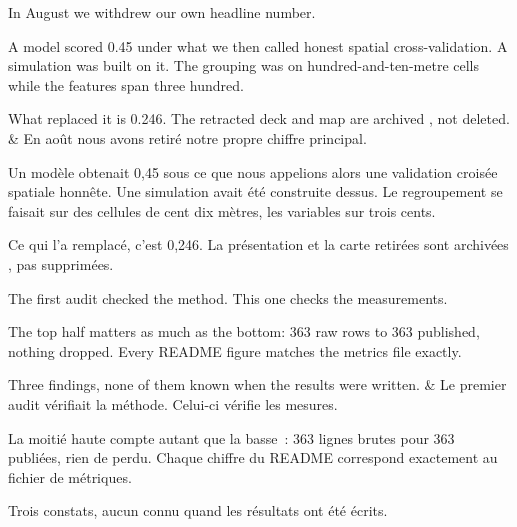 \documentclass[10pt,a4paper]{article}
\begin{document}
\begin{say}
In August we withdrew our own headline number.

A model scored 0.45 under what we then called honest spatial cross-validation. A
simulation was built on it. The grouping was on hundred-and-ten-metre cells while
the features span three hundred. 

What replaced it is 0.246. The retracted deck and map are archived , not deleted.
&
En août nous avons retiré notre propre chiffre principal.

Un modèle obtenait 0,45 sous ce que nous appelions alors une validation croisée
spatiale honnête. Une simulation avait été construite dessus. Le regroupement se
faisait sur des cellules de cent dix mètres, les variables sur trois cents.

Ce qui l'a remplacé, c'est 0,246. La présentation et la carte retirées sont
archivées , pas supprimées.
\end{say}

\begin{say}
The first audit checked the method. This one checks the measurements.

The top half matters as much as the bottom: 363 raw rows to 363 published, nothing
dropped. Every README figure matches the metrics file exactly.

 Three
findings, none of them known when the results were written.
&
Le premier audit vérifiait la méthode. Celui-ci vérifie les mesures.

La moitié haute compte autant que la basse~: 363 lignes brutes pour 363 publiées,
rien de perdu. Chaque chiffre du README correspond exactement au fichier de
métriques.

 Trois
constats, aucun connu quand les résultats ont été écrits.
\end{say}
\end{document}
